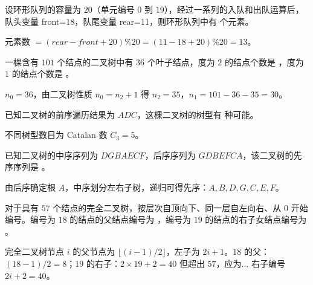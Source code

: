 \begin{question}
设环形队列的容量为 $20$（单元编号 $0$ 到 $19$），经过一系列的入队和出队运算后，队头变量 front=18，队尾变量 rear=11，则环形队列中有 \underline{\hspace{4em}} 个元素。
\begin{solution}
元素数 $= (rear - front + 20) \% 20 = (11 - 18 + 20) \% 20 = 13$。
\end{solution}
\end{question}

\begin{question}
一棵含有 $101$ 个结点的二叉树中有 $36$ 个叶子结点，度为 $2$ 的结点个数是 \underline{\hspace{4em}}，度为 $1$ 的结点个数是 \underline{\hspace{4em}}。
\begin{solution}
$n_0=36$，由二叉树性质 $n_0=n_2+1$ 得 $n_2=35$，$n_1=101-36-35=30$。
\end{solution}
\end{question}

\begin{question}
已知二叉树的前序遍历结果为 $ADC$，这棵二叉树的树型有 \underline{\hspace{4em}} 种可能。
\begin{solution}
不同树型数目为 Catalan 数 $C_3=5$。
\end{solution}
\end{question}

\begin{question}
已知二叉树的中序序列为 $DGBAECF$，后序序列为 $GDBEFCA$，该二叉树的先序序列是 \underline{\hspace{4em}}。
\begin{solution}
由后序确定根 $A$，中序划分左右子树，递归可得先序：$A,B,D,G,C,E,F$。
\end{solution}
\end{question}

\begin{question}
对于具有 $57$ 个结点的完全二叉树，按层次自顶向下、同一层自左向右、从 $0$ 开始编号。编号为 $18$ 的结点的父结点编号为 \underline{\hspace{4em}}，编号为 $19$ 的结点的右子女结点编号为 \underline{\hspace{4em}}。
\begin{solution}
完全二叉树节点 $i$ 的父节点为 $\lfloor(i-1)/2\rfloor$，左子为 $2i+1$。$18$ 的父：$(18-1)/2=8$；$19$ 的右子：$2\times19+2=40$ 但超出 $57$，应为... 右子编号 $2i+2=40$。
\end{solution}
\end{question}

